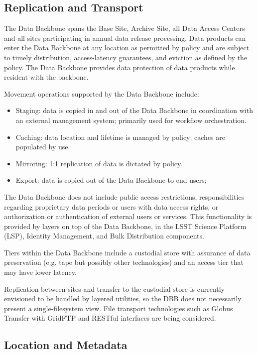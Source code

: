 \documentclass[DM,toc]{lsstdoc}
\begin{document}
\subsection{Replication and Transport}\label{dbb-replication-and-transport}

The Data Backbone spans the Base Site, Archive Site, all Data Access Centers
and all sites participating in annual data release processing.  Data products
can enter the Data Backbone at any location as permitted by policy and are
subject to timely distribution, access-latency guarantees, and eviction as
defined by the policy. The Data Backbone provides data protection of data
products while resident with the backbone.

Movement operations supported by the Data Backbone include:
\begin{itemize}
	\item Staging: data is copied in and out of the Data Backbone in coordination with an external management system; primarily used for workflow orchestration.
	\item Caching: data location and lifetime is managed by policy; caches are populated by use.
	\item Mirroring: 1:1 replication of data is dictated by policy.
	\item Export: data is copied out of the Data Backbone to end users;
\end{itemize}

The Data Backbone does not include public access restrictions, responsibilities
regarding proprietary data periods or users with data access rights, or
authorization or authentication of external users or services. This
functionality is provided by layers on top of the Data Backbone, in the
LSST Science Platform (LSP), Identity Management, and Bulk Distribution components.

Tiers within the Data Backbone include a custodial store with assurance of
data preservation (e.g. tape but possibly other technologies) and an access tier that may have lower latency.

Replication between sites and transfer to the custodial store is currently envisioned to be handled by layered utilities, so the DBB does not necessarily present a single-filesystem view.
File transport technologies such as Globus Transfer \citep{GlobusTransfer} with GridFTP and RESTful interfaces are being considered.

\subsection{Location and Metadata}\label{dbb-location-and-metadata}
\end{document}
